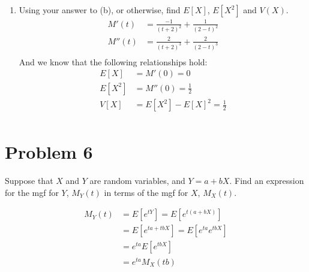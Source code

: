 \documentclass{article}
\newcommand{\1}{\mathbf{1}}
\begin{document}
\begin{enumerate}
    \newpage
    \item Using your answer to (b), or otherwise, find $E[X]$, $E[X^2]$ and $V(X)$.
    \begin{align*}
        M'(t)  &= \frac{-1}{(t+2)^2} + \frac{1}{(2-t)^2} \\
        M''(t) &= \frac{2}{(t+2)^3} + \frac{2}{(2-t)^3} \\
    \end{align*}
    And we know that the following relationships hold:
    \begin{align*}
        E[X] &= M'(0) = 0\\
        E[X^2] &= M''(0) = \frac{1}{2}\\
        V[X] &= E[X^2] - E[X]^2 = \frac{1}{2} \\
    \end{align*}
\end{enumerate}



\newpage
\section*{Problem 6}
Suppose that $X$ and $Y$ are random variables, and $Y = a + bX$.  
Find an expression for the mgf for $Y$, $M_Y(t)$ in terms of the mgf for $X$, $M_X(t)$.

    \begin{align*}
        M_Y(t) &= E\left[e^{tY}\right] = E\left[e^{t(a+bX)}\right]\\
        &= E\left[e^{ta+tbX}\right] = E\left[e^{ta}e^{tbX}\right] \\
        &= e^{ta} E\left[e^{tbX}\right] \\
        &= e^{ta} M_X(tb) \\
    \end{align*}
    
    
    

\newpage
\end{document}
